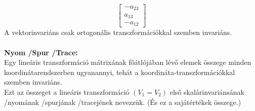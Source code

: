 \documentclass[11pt,a4paper]{article}
\begin{document}
\begin{tcolorbox}[colback=red!5!white,colframe=red!60!black,title= 3. Mátrix vektorinvariánsa és nyoma (trace{,} spur)]
$$\begin{bmatrix}
        -a_{23}\\
        a_{13}\\
        -a_{12}
    \end{bmatrix}$$
    A vektorinvariáns csak ortogonális transzformációkkal szemben invariáns. \\\\
    \textbf{Nyom /Spur /Trace:} \\
    Egy lineáris transzformáció mátrixának főátlójában lévő elemek összege minden koordinátarendszerben ugyanannyi, tehát a koordináta-transzformációkkal szemben invariáns. \\
    Ezt az összeget a lineáris transzformáció $(V_{1}=V_{2})$ első skalárinvariánsának /nyomának /spurjának /tracejének nevezzük. (És ez a sajátértékek összege.)
    \begin{center}
    \end{center}
\end{tcolorbox}
\end{document}
